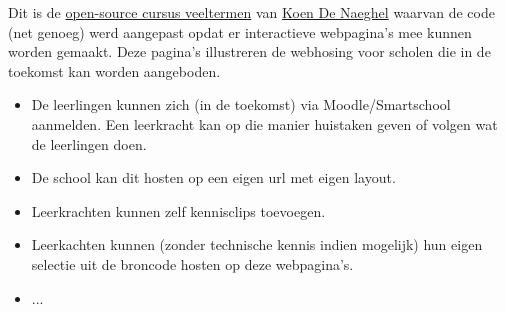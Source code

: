 \documentclass{ximera}
\begin{document}
Dit is de \href{https://www.koendenaeghel.be/opensource.htm}{open-source cursus veeltermen} van \href{https://www.koendenaeghel.be/}{Koen De Naeghel} waarvan de code (net genoeg) werd aangepast opdat er interactieve webpagina's mee kunnen worden gemaakt. Deze pagina's illustreren de webhosing voor scholen die in de toekomst kan worden aangeboden. 

\begin{itemize}
    \item De leerlingen kunnen zich (in de toekomst) via Moodle/Smartschool aanmelden. Een leerkracht kan op die manier huistaken geven of volgen wat de leerlingen doen. 
    \item De school kan dit hosten op een eigen url met eigen layout. 
    \item Leerkrachten kunnen zelf kennisclips toevoegen. 
    \item Leerkachten kunnen (zonder technische kennis indien mogelijk) hun eigen selectie uit de broncode hosten op deze webpagina's.
    \item ...
\end{itemize}
\end{document}
